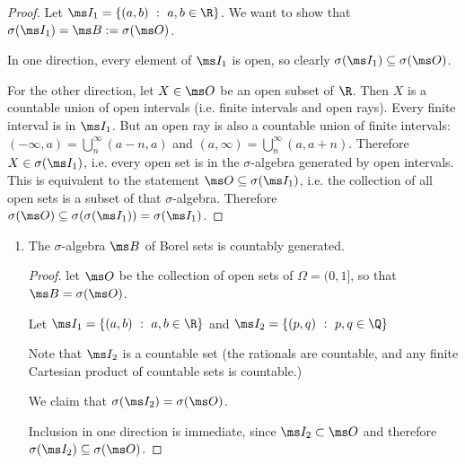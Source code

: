 \begin{enumerate}
\begin{proof}
      Let $\ms I_1 = \{(a, b) ~:~ a, b \in \R\}$. We want to show that $\sigma(\ms I_1) = \ms B := \sigma(\ms O)$.

      In one direction, every element of $\ms I_1$ is open, so clearly $\sigma(\ms I_1) \subseteq \sigma(\ms O)$.

      For the other direction, let $X \in \ms O$ be an open subset of $\R$. Then $X$ is a countable union of
      open intervals (i.e. finite intervals and open rays). Every finite interval is in $\ms I_1$. But an open
      ray is also a countable union of finite intervals: $(-\infty, a) = \bigcup_n^\infty (a-n, a)$
      and $(a, \infty) = \bigcup_n^\infty (a, a + n)$. Therefore $X \in \sigma(\ms I_1)$, i.e. every open set
      is in the $\sigma$-algebra generated by open intervals. This is equivalent to the
      statement $\ms O \subseteq \sigma(\ms I_1)$, i.e. the collection of all open sets is a subset of
      that $\sigma$-algebra. Therefore $\sigma(\ms O) \subseteq \sigma(\sigma(\ms I_1)) = \sigma(\ms I_1)$.
    \end{proof}

  \begin{enumerate}[label=(\alph*)]

  \item
    \begin{claim*}
      The $\sigma$-algebra $\ms B$ of Borel sets is countably generated.
    \end{claim*}
    \begin{proof}
      let $\ms O$ be the collection of open sets of $\Omega = (0, 1]$, so that $\ms B = \sigma(\ms O)$.

      Let $\ms I_1 = \{(a, b) ~:~ a, b \in \R\}$ and $\ms I_2 = \{(p, q) ~:~ p, q \in \Q\}$

      Note that $\ms I_2$ is a countable set (the rationals are countable, and any finite Cartesian product of
      countable sets is countable.)

      We claim that $\sigma(\ms I_2) = \sigma(\ms O)$.

      Inclusion in one direction is immediate, since $\ms I_2 \subset \ms O$ and
      therefore $\sigma(\ms I_2) \subseteq\sigma(\ms O)$.


\end{proof}
\end{enumerate}
\end{enumerate}
